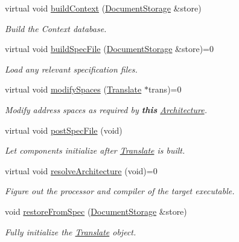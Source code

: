 \begin{DoxyCompactItemize}
virtual void \mbox{\hyperlink{class_architecture_a9a2fd38d4d08155637ebee1e043fd9a8}{build\+Context}} (\mbox{\hyperlink{class_document_storage}{Document\+Storage}} \&store)
\begin{DoxyCompactList}\small\item\em Build the Context database. \end{DoxyCompactList}\item 
virtual void \mbox{\hyperlink{class_architecture_ad9e8edfa21e63d4b37b8003397804933}{build\+Spec\+File}} (\mbox{\hyperlink{class_document_storage}{Document\+Storage}} \&store)=0
\begin{DoxyCompactList}\small\item\em Load any relevant specification files. \end{DoxyCompactList}\item 
virtual void \mbox{\hyperlink{class_architecture_aec1784d8729ba0f13cd7ea63ee546995}{modify\+Spaces}} (\mbox{\hyperlink{class_translate}{Translate}} $\ast$trans)=0
\begin{DoxyCompactList}\small\item\em Modify address spaces as required by {\bfseries{this}} \mbox{\hyperlink{class_architecture}{Architecture}}. \end{DoxyCompactList}\item 
virtual void \mbox{\hyperlink{class_architecture_a7cee782dabf4362f10a0bbb4c950f85e}{post\+Spec\+File}} (void)
\begin{DoxyCompactList}\small\item\em Let components initialize after \mbox{\hyperlink{class_translate}{Translate}} is built. \end{DoxyCompactList}\item 
virtual void \mbox{\hyperlink{class_architecture_aea7d061dab582340c8e9bb3323abdf4a}{resolve\+Architecture}} (void)=0
\begin{DoxyCompactList}\small\item\em Figure out the processor and compiler of the target executable. \end{DoxyCompactList}\item 
void \mbox{\hyperlink{class_architecture_aed18df408eb73d0735966c68b44e413b}{restore\+From\+Spec}} (\mbox{\hyperlink{class_document_storage}{Document\+Storage}} \&store)
\begin{DoxyCompactList}\small\item\em Fully initialize the \mbox{\hyperlink{class_translate}{Translate}} object. \end{DoxyCompactList}\item 

\end{DoxyCompactItemize}
